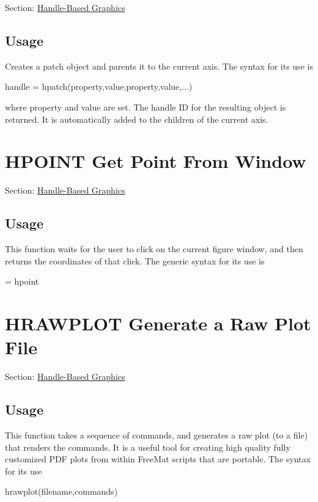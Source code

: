 Section\-: \hyperlink{sec_handle}{Handle-\/\-Based Graphics} \hypertarget{vtkwidgets_vtkxyplotwidget_Usage}{}\subsection{Usage}\label{vtkwidgets_vtkxyplotwidget_Usage}
Creates a patch object and parents it to the current axis. The syntax for its use is \begin{DoxyVerb}  handle = hpatch(property,value,property,value,...)
\end{DoxyVerb}
 where {\ttfamily property} and {\ttfamily value} are set. The handle I\-D for the resulting object is returned. It is automatically added to the children of the current axis. \hypertarget{handle_hpoint}{}\section{H\-P\-O\-I\-N\-T Get Point From Window}\label{handle_hpoint}
Section\-: \hyperlink{sec_handle}{Handle-\/\-Based Graphics} \hypertarget{vtkwidgets_vtkxyplotwidget_Usage}{}\subsection{Usage}\label{vtkwidgets_vtkxyplotwidget_Usage}
This function waits for the user to click on the current figure window, and then returns the coordinates of that click. The generic syntax for its use is \begin{DoxyVerb}  [x,y] = hpoint
\end{DoxyVerb}
 \hypertarget{handle_hrawplot}{}\section{H\-R\-A\-W\-P\-L\-O\-T Generate a Raw Plot File}\label{handle_hrawplot}
Section\-: \hyperlink{sec_handle}{Handle-\/\-Based Graphics} \hypertarget{vtkwidgets_vtkxyplotwidget_Usage}{}\subsection{Usage}\label{vtkwidgets_vtkxyplotwidget_Usage}
This function takes a sequence of commands, and generates a raw plot (to a file) that renders the commands. It is a useful tool for creating high quality fully customized P\-D\-F plots from within Free\-Mat scripts that are portable. The syntax for its use \begin{DoxyVerb}  hrawplot(filename,commands)
\end{DoxyVerb}
